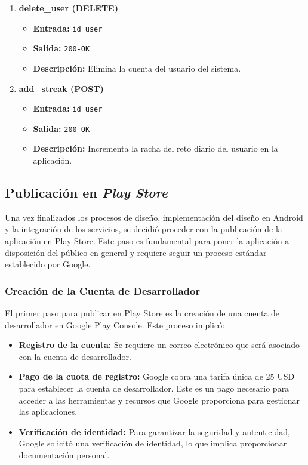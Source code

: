 \begin{enumerate}
    \item \textbf{delete\_user (DELETE)}
    \begin{itemize}
        \item \textbf{Entrada:} \texttt{id\_user}
        \item \textbf{Salida:} \texttt{200-OK}
        \item \textbf{Descripción:} Elimina la cuenta del usuario del sistema.
    \end{itemize}

    \item \textbf{add\_streak (POST)}
    \begin{itemize}
        \item \textbf{Entrada:} \texttt{id\_user}
        \item \textbf{Salida:} \texttt{200-OK}
        \item \textbf{Descripción:} Incrementa la racha del reto diario del usuario en la aplicación.
    \end{itemize}


\end{enumerate}



\subsection{Publicación en \textit{Play Store}}

Una vez finalizados los procesos de diseño, implementación del diseño en Android y la integración de los servicios, se decidió proceder con la publicación de la aplicación en Play Store. Este paso es fundamental para poner la aplicación a disposición del público en general y requiere seguir un proceso estándar establecido por Google.

\subsubsection{Creación de la Cuenta de Desarrollador}

El primer paso para publicar en Play Store es la creación de una cuenta de desarrollador en Google Play Console. Este proceso implicó:

\begin{itemize}
    \item \textbf{Registro de la cuenta:} Se requiere un correo electrónico que será asociado con la cuenta de desarrollador. 
    \item \textbf{Pago de la cuota de registro:} Google cobra una tarifa única de 25 USD para establecer la cuenta de desarrollador. Este es un pago necesario para acceder a las herramientas y recursos que Google proporciona para gestionar las aplicaciones.
    \item \textbf{Verificación de identidad:} Para garantizar la seguridad y autenticidad, Google solicitó una verificación de identidad, lo que implica proporcionar documentación personal.
\end{itemize}

